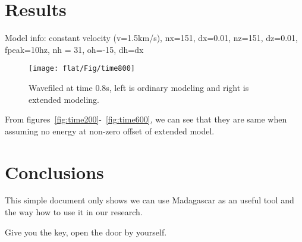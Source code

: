 \section{Results}

Model info: constant velocity (v=1.5km/s), nx=151, dx=0.01, nz=151, dz=0.01, fpeak=10hz, nh = 31, oh=-15, dh=dx




\begin{figure}
    \texttt{[image: flat/Fig/time800]} 
    \caption{Wavefiled at time 0.8s, left is ordinary modeling and right is extended modeling.}
\label{Fig:noise}
\end{figure}

From figures~\ref{fig:time200}-~\ref{fig:time600}, we can see that they are same when assuming no energy at non-zero offset of extended model.

\section{Conclusions}


This simple document only shows we can use Madagascar as an useful tool and the way how to use it in our research.

Give you the key, open the door by yourself.




